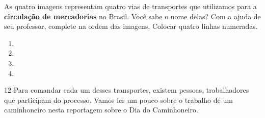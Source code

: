 



As quatro imagens representam quatro vias de transportes que utilizamos
para a \textbf{circulação de mercadorias} no Brasil. Você sabe o nome
delas? Com a ajuda de seu professor, complete na ordem das imagens.
Colocar quatro linhas numeradas.

\begin{enumerate}
\item {}

\item {}

\item {}

\item {}

\end{enumerate}

\pagebreak

\num{12} Para comandar cada um desses transportes, existem pessoas, trabalhadores que participam do processo. Vamos ler um
pouco sobre o trabalho de um caminhoneiro nesta reportagem sobre o Dia
do Caminhoneiro.

